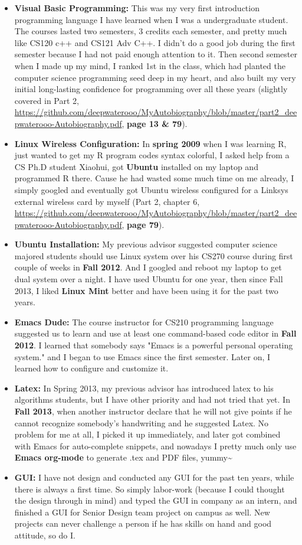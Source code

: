 \documentclass[9pt,b5paper]{article}
\begin{document}
\begin{itemize}
\item \textbf{Visual Basic Programming:} This was my very first introduction programming language I have learned when I was a undergraduate student. The courses lasted two semesters, 3 credits each semester, and pretty much like CS120 c++ and CS121 Adv C++. I didn't do a good job during the first semester because I had not paid enough attention to it. Then second semester when I made up my mind, I ranked 1st in the class, which had planted the computer science programming seed deep in my heart, and also built my very initial long-lasting confidence for programming over all these years (slightly covered in Part 2, \url{https://github.com/deepwaterooo/MyAutobiography/blob/master/part2_deepwaterooo-Autobiography.pdf}, \textbf{page 13 \& 79}).
\item \textbf{Linux Wireless Configuration:} In \textbf{spring 2009} when I was learning R, just wanted to get my R program codes syntax colorful, I asked help from a CS Ph.D student Xiaohui, got \textbf{Ubuntu} installed on my laptop and programmed R there. Cause he had wasted some much time on me already, I simply googled and eventually got Ubuntu wireless configured for a Linksys external wireless card by myself (Part 2, chapter 6,  \url{https://github.com/deepwaterooo/MyAutobiography/blob/master/part2_deepwaterooo-Autobiography.pdf}, \textbf{page 79}).
\item \textbf{Ubuntu Installation:} My previous advisor suggested computer science majored students should use Linux system over his CS270 course during first couple of weeks in \textbf{Fall 2012}. And I googled and reboot my laptop to get dual system over a night. I have used Ubuntu for one year, then since Fall 2013, I liked \textbf{Linux Mint} better and have been using it for the past two years.
\item \textbf{Emacs Dude:} The course instructor for CS210 programming language suggested us to learn and use at least one command-based code editor in \textbf{Fall 2012}. I learned that somebody says "Emacs is a powerful personal operating system." and I began to use Emacs since the first semester. Later on, I learned how to configure and customize it.
\item \textbf{Latex:} In Spring 2013, my previous advisor has introduced latex to his algorithms students, but I have other priority and had not tried that yet. In \textbf{Fall 2013}, when another instructor declare that he will not give points if he cannot recognize somebody's handwriting and he suggested Latex. No problem for me at all, I picked it up immediately, and later got combined with Emacs for auto-complete snippets, and nowadays I pretty much only use \textbf{Emacs org-mode} to generate .tex and PDF files, yummy\textasciitilde{}~
\item \textbf{GUI:} I have not design and conducted any GUI for the past ten years, while there is always a first time. So simply labor-work (because I could thought the design through in mind) and typed the GUI in company as an intern, and finished a GUI for Senior Design team project on campus as well. New projects can never challenge a person if he has skills on hand and good attitude, so do I.
\end{itemize}
\end{document}
